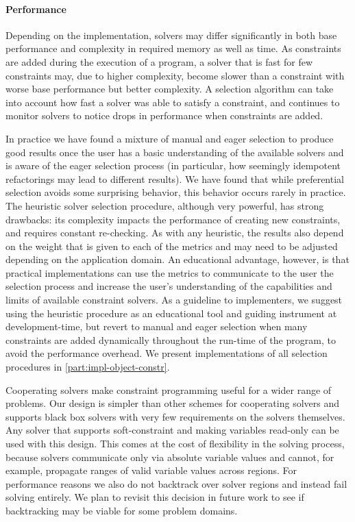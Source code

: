 \paragraph*{Performance} Depending on the implementation, solvers may
differ significantly in both base performance and complexity in
required memory as well as time. As constraints are added during the
execution of a program, a solver that is fast for few constraints may,
due to higher complexity, become slower than a constraint with worse
base performance but better complexity. A selection algorithm can take
into account how fast a solver was able to satisfy a constraint, and
continues to monitor solvers to notice drops in performance when
constraints are added.

In practice we have found a mixture of manual and eager selection to
produce good results once the user has a basic understanding of the
available solvers and is aware of the eager selection process (in
particular, how seemingly idempotent refactorings may lead to
different results). We have found that while preferential selection
avoids some surprising behavior, this behavior occurs rarely in
practice. The heuristic solver selection procedure, although very
powerful, has strong drawbacks: its complexity impacts the performance
of creating new constraints, and requires constant re-checking. As
with any heuristic, the results also depend on the weight that is
given to each of the metrics and may need to be adjusted depending on
the application domain. An educational advantage, however, is that
practical implementations can use the metrics to communicate to the
user the selection process and increase the user's understanding of
the capabilities and limits of available constraint solvers. As a
guideline to implementers, we suggest using the heuristic procedure as
an educational tool and guiding instrument at development-time, but
revert to manual and eager selection when many constraints are added
dynamically throughout the run-time of the program, to avoid the
performance overhead. We present implementations of all selection
procedures in \autoref{part:impl-object-constr}.

\SummarySep

Cooperating solvers make constraint programming useful for a wider range of
problems. Our design is simpler than other schemes for cooperating solvers and
supports black box solvers with very few requirements on the solvers
themselves. Any solver that supports soft-constraint and making variables
read-only can be used with this design. This comes at the cost of flexibility in
the solving process, because solvers communicate only via absolute variable
values and cannot, for example, propagate ranges of valid variable values across
regions. For performance reasons we also do not backtrack over solver regions
and instead fail solving entirely. We plan to revisit this decision in future
work to see if backtracking may be viable for some problem domains.


